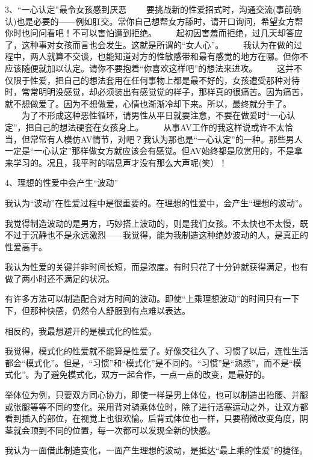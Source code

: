\documentclass[12pt,UTF8]{ctexbook}
\begin{document}
3、“一心认定”最令女孩感到厌恶 　　要挑战新的性爱招式时，沟通交流(事前确认)也是必要的——例如肛交。常你自己想帮女方舔时，请开口询问，希望女方帮你时也问问看吧！不可以害怕遭到拒绝。 　　起初因害羞而拒绝，过几天却答应了，这种事对女孩而言也会发生。这就是所谓的“女人心”。 　　我认为在做的过程中，两人就算不交谈，也能知道对方的性敏感带和最有感觉的地方在哪。但你不应该随便就加以认定。请你不要抱着“你喜欢这样吧”的想法来进攻。 　　这并不仅限于性爱，把自己的想法套用在任何事物上都是最不好的，女孩遭受那种对待时，常常明明没感觉，却必须装出有感觉觉的样子，那样真的很痛苦。因为痛苦，就不想做爱了。因为不想做爱，心情也渐渐冷却下来。所以，最终就分手了。 　　为了不形成这种恶性循环，请男性从平日就要注意，不要在做爱时“一心认定”，把自己的想法硬套在女孩身上。 　　从事AV工作的我这样说或许不太恰当，但常常有人模仿AV情节，对吧？我认为那也是“一心认定”的一种。那些男人一定是“一心认定”那样做女方就应该会有感觉。但AV始终都是欣赏用的，不是拿来学习的。况且，我平时的喘息声才没有那么大声呢(笑）！

4、理想的性爱中会产生“波动”

我认为“波动”在性爱过程中是很重要的。在理想的性爱中，会产生“理想的波动”。

我觉得制造波动的是男方，巧妙搭上波动的，则是我们女孩。不太快也不太慢，既不过于沉静也不是永远激烈——我觉得，能为我制造这种绝妙波动的人，是真正的性爱高手。

我认为性爱的关键并非时间长短，而是浓度。有时只花了十分钟就获得满足，也有做了两小时还不满足的状况。

有许多方法可以制造配合对方时间的波动。即使“上乘理想波动”的时间只有一下下，但那种快感，仍然令人舒服到有点难以表达。

相反的，我最想避开的是模式化的性爱。

我觉得，模式化的性爱就不能算是性爱了。好像交往久了、习惯了以后，连性生活都会“模式化”。但是，“习惯”和“模式化”是不同的。“习惯”是“熟悉”，而不是“模式化”。为了避免模式化，双方一起合作，一点一点的改变，是最好的。

举体位为例，只要双方同心协力，即使一样是男上体位，也可以制造出抬腰、并腿或张腿等等不同的变化。采用背对骑乘体位时，除了进行活塞运动之外，让双方都看到插入的部位，在视觉上也很欢愉。后背式体位也一样，只要稍微改变角度，阴茎就会顶到不同的位置，每一次都可以发现全新的快感。

我认为一面借此制造变化，一面产生理想的波动，是抵达“最上乘的性爱”的捷径。
\end{document}
